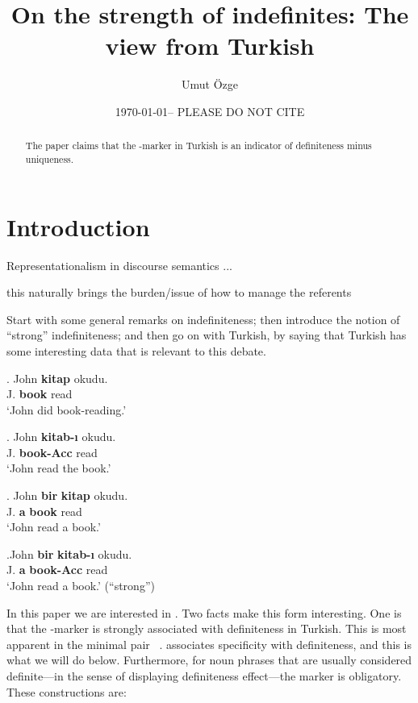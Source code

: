 \documentclass[11pt,a4paper]{article}
\title{On the strength of indefinites: The view from Turkish}
\author{Umut \"Ozge}
\date{\today -- PLEASE DO NOT CITE}
\begin{document}
\maketitle

\begin{abstract}
The paper claims that the \acc-marker in Turkish is an indicator of definiteness
minus uniqueness.
\end{abstract}

\section{Introduction}

Representationalism in discourse semantics
 ...

this naturally brings the burden/issue of how to manage the referents


Start with some general remarks on indefiniteness; then introduce the notion of
``strong'' indefiniteness; and then go on with Turkish, by saying that Turkish
has some interesting data that is relevant to this debate.

\exg. {\label{para-bare}John} {\bf kitap} {okudu.} \\
	{J.} {\bf book} {read}\\
`John did book-reading.'

\exg. {\label{para-def}John} {\bf kitab-{\i}}  {okudu.} \\
	{J.} {\bf book-Acc}	{read}\\
`John read the book.'

\exg. {\label{para-indef}John} {\bf bir} {\bf kitap} {okudu.}\\
	{J.} {\bf a}  {\bf book} {read}\\
`John read a book.'

\exg.{\label{para-acc}John} {\bf bir} {\bf kitab-{\i}} {okudu.}\\
	{J.} {\bf a} {\bf book-Acc} {read} \\
`John read a book.' (``strong'')




In this paper we are interested in . Two facts make
this form interesting. One is that the \acc-marker is strongly
associated with definiteness in Turkish. This is most apparent in the
minimal pair  \versus\ .
 associates specificity with definiteness, and this is
what we will do below. Furthermore, for noun phrases that are usually
considered definite---in the sense of displaying definiteness
effect---the marker is obligatory. These constructions are:
\end{document}
